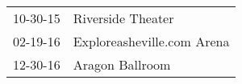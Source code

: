 \begin{supertabular}{p{0.07\textwidth}p{0.23\textwidth}}
 10-30-15 &           Riverside Theater \\
 02-19-16 &  Exploreasheville.com Arena \\
 12-30-16 &             Aragon Ballroom \\
\end{supertabular}

